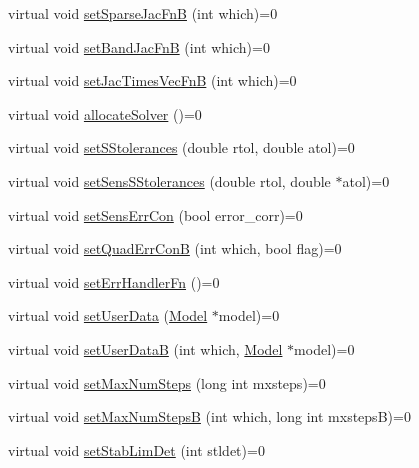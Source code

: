 \begin{DoxyCompactItemize}
\item 
virtual void \mbox{\hyperlink{classamici_1_1_solver_a101c62151da172cc06a025a3060b50de}{set\+Sparse\+Jac\+FnB}} (int which)=0
\item 
virtual void \mbox{\hyperlink{classamici_1_1_solver_a1040308561e87b1e2d24c3ab9581e14d}{set\+Band\+Jac\+FnB}} (int which)=0
\item 
virtual void \mbox{\hyperlink{classamici_1_1_solver_a2c30d06de7f3f5f452dc80d5f03db9d7}{set\+Jac\+Times\+Vec\+FnB}} (int which)=0
\item 
virtual void \mbox{\hyperlink{classamici_1_1_solver_a0ae4930d2f6fa37ebcc55e334012fd6d}{allocate\+Solver}} ()=0
\item 
virtual void \mbox{\hyperlink{classamici_1_1_solver_a6a688afa51ec71eded6c8801faaafac3}{set\+S\+Stolerances}} (double rtol, double atol)=0
\item 
virtual void \mbox{\hyperlink{classamici_1_1_solver_a16ec3b994dd433e71fcb58eea3cd529f}{set\+Sens\+S\+Stolerances}} (double rtol, double $\ast$atol)=0
\item 
virtual void \mbox{\hyperlink{classamici_1_1_solver_a1928530b3110cb9229d6836c5389379f}{set\+Sens\+Err\+Con}} (bool error\+\_\+corr)=0
\item 
virtual void \mbox{\hyperlink{classamici_1_1_solver_a0d5e55201b30383f1272146935f43c78}{set\+Quad\+Err\+ConB}} (int which, bool flag)=0
\item 
virtual void \mbox{\hyperlink{classamici_1_1_solver_ab5e90e0ad8f195cd6ca2ce477cc734b7}{set\+Err\+Handler\+Fn}} ()=0
\item 
virtual void \mbox{\hyperlink{classamici_1_1_solver_ac1ca4675503688acf946f6530fb12c10}{set\+User\+Data}} (\mbox{\hyperlink{classamici_1_1_model}{Model}} $\ast$model)=0
\item 
virtual void \mbox{\hyperlink{classamici_1_1_solver_ac5c347a985fa73861a88e76c7b9904f8}{set\+User\+DataB}} (int which, \mbox{\hyperlink{classamici_1_1_model}{Model}} $\ast$model)=0
\item 
virtual void \mbox{\hyperlink{classamici_1_1_solver_a29f208ce304b01c8fe294ab9143a98e5}{set\+Max\+Num\+Steps}} (long int mxsteps)=0
\item 
virtual void \mbox{\hyperlink{classamici_1_1_solver_a1163fddb222195354bdcf306fc52a1d0}{set\+Max\+Num\+StepsB}} (int which, long int mxstepsB)=0
\item 
virtual void \mbox{\hyperlink{classamici_1_1_solver_a040fb365c47a8e8ccc1f32021b38bfcb}{set\+Stab\+Lim\+Det}} (int stldet)=0
\item 

\end{DoxyCompactItemize}
